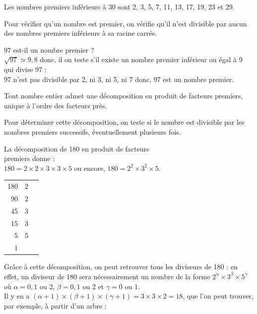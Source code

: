 \smallskip

\begin{propriete}
   Les nombres premiers inférieurs à 30 sont 2, 3, 5, 7, 11, 13, 17, 19, 23 et 29.
\end{propriete}

\smallskip

Pour vérifier qu'un nombre est premier, on vérifie qu'il n'est divisible par aucun des nombres premiers inférieurs à sa racine carrée.
 
\begin{exemple*1}
   97 est-il un nombre premier ? \\
   $\sqrt{97}\simeq9,8$ donc, il on teste s'il existe un nombre premier inférieur ou égal à 9 qui divise 97 : \\
    97 n'est pas divisible par 2, ni 3, ni 5, ni 7 donc, 97 est un nombre premier.
\end{exemple*1}


\begin{propriete}[Décomposition]
   Tout nombre entier admet une décomposition en produit de facteurs premiers, unique à l'ordre des facteurs près. 
\end{propriete}

\medskip

Pour déterminer cette décomposition, on teste si le nombre est divisible par les nombres premiers successifs, éventuellement plusieurs fois.

\begin{exemple*1}
   \begin{minipage}{8cm}
      La décomposition de 180 en produit de facteurs \\
      premiers donne : \\
      $180=2\times2\times3\times3\times5$ ou encore, $180=2^2\times3^2\times5$.
   \end{minipage}
   {\renewcommand{\arraystretch}{0.7}
   \begin{tabular}{r|ll}
      180 & 2 & \\
      90 & 2 & \\
      45 & 3 \qquad & \\
      15 & 3 & \\
      5 & 5 & \\
      1 & & \\
   \end{tabular}}
\end{exemple*1}

\medskip

Grâce à cette décomposition, on peut retrouver tous les diviseurs de 180 : en effet, un diviseur de 180 sera nécessairement un nombre de la forme $2^\alpha\times3^\beta\times5^\gamma$ où $\alpha=0, 1$ ou 2, $\beta=0, 1$ ou 2 et $\gamma=0$ ou $1$. \\
Il y en a $(\alpha+1)\times(\beta+1)\times(\gamma+1) =3\times3\times2 =18$, que l'on peut trouver, par exemple, à partir d'un arbre :

